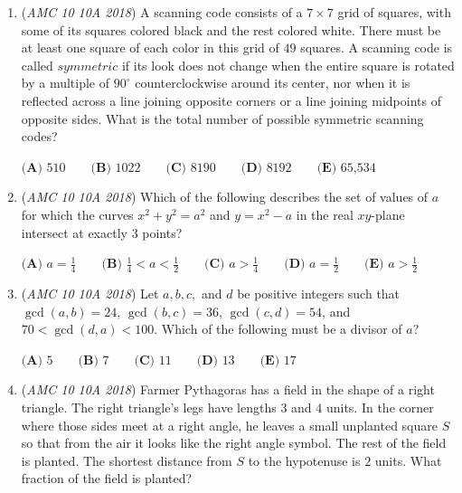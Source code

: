 \begin{enumerate}
 $\textbf{(A) }   \frac{1}{5}   \qquad        \textbf{(B) }   \frac{1}{4}   \qquad    \textbf{(C) }   \frac{3}{10}   \qquad   \textbf{(D) } \frac{7}{20} \qquad  \textbf{(E) }   \frac{2}{5}$


	\item (\textit{AMC 10 10A 2018}) A scanning code consists of a $7 \times 7$ grid of squares, with some of its squares colored black and the rest colored white. There must be at least one square of each color in this grid of $49$ squares. A scanning code is called $\textit{symmetric}$ if its look does not change when the entire square is rotated by a multiple of $90 ^{\circ}$ counterclockwise around its center, nor when it is reflected across a line joining opposite corners or a line joining midpoints of opposite sides. What is the total number of possible symmetric scanning codes?


 $\textbf{(A)} \text{ 510} \qquad \textbf{(B)} \text{ 1022} \qquad \textbf{(C)} \text{ 8190} \qquad \textbf{(D)} \text{ 8192} \qquad \textbf{(E)} \text{ 65,534}$


	\item (\textit{AMC 10 10A 2018}) Which of the following describes the set of values of $a$ for which the curves $x^2+y^2=a^2$ and $y=x^2-a$ in the real $xy$-plane intersect at exactly $3$ points?


 $\textbf{(A) }a=\frac14 \qquad \textbf{(B) }\frac14 < a < \frac12 \qquad \textbf{(C) }a>\frac14 \qquad \textbf{(D) }a=\frac12 \qquad \textbf{(E) }a>\frac12 \qquad$


	\item (\textit{AMC 10 10A 2018}) Let $a, b, c,$ and $d$ be positive integers such that $\gcd(a, b)=24$, $\gcd(b, c)=36$, $\gcd(c, d)=54$, and $70<\gcd(d, a)<100$. Which of the following must be a divisor of $a$?


 $\textbf{(A)} \text{ 5} \qquad \textbf{(B)} \text{ 7} \qquad \textbf{(C)} \text{ 11} \qquad \textbf{(D)} \text{ 13} \qquad \textbf{(E)} \text{ 17}$


	\item (\textit{AMC 10 10A 2018}) Farmer Pythagoras has a field in the shape of a right triangle. The right triangle's legs have lengths $3$ and $4$ units. In the corner where those sides meet at a right angle, he leaves a small unplanted square $S$ so that from the air it looks like the right angle symbol. The rest of the field is planted. The shortest distance from $S$ to the hypotenuse is $2$ units. What fraction of the field is planted?



\end{enumerate}
